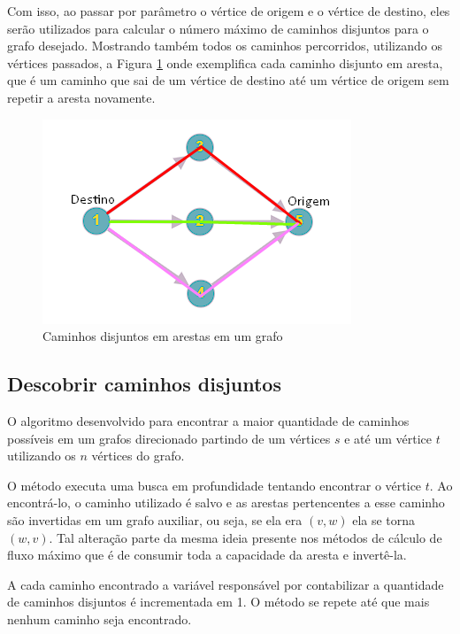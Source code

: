 Com isso, ao passar por parâmetro o vértice de origem e o vértice de destino, eles serão utilizados para calcular o número máximo de caminhos disjuntos para o grafo desejado. Mostrando também todos os caminhos percorridos, utilizando os vértices passados, a Figura \ref{fig:figure2} onde exemplifica cada caminho disjunto em aresta, que é um caminho que sai de um vértice de destino até um vértice de origem sem repetir a aresta novamente.

\newpage

\begin{figure}[ht]
    \centering
    \includegraphics[width=.5\textwidth]{figuras/disjoint paths.png}
    \caption{Caminhos disjuntos em arestas em um grafo}
    \label{fig:figure2}
\end{figure}

\subsection{Descobrir caminhos disjuntos}

O algoritmo desenvolvido para encontrar a maior quantidade de caminhos possíveis em um grafos direcionado partindo de um vértices \(s\) e até um vértice \(t\) utilizando os \(n\) vértices do grafo.

O método executa uma busca em profundidade tentando encontrar o vértice \(t\). Ao encontrá-lo, o caminho utilizado é salvo e as arestas pertencentes a esse caminho são invertidas em um grafo auxiliar, ou seja, se ela era \((v,w)\) ela se torna \((w,v)\). Tal alteração parte da mesma ideia presente nos métodos de cálculo de fluxo máximo que é de consumir toda a capacidade da aresta e invertê-la. 

A cada caminho encontrado a variável responsável por contabilizar a quantidade de caminhos disjuntos é incrementada em 1. O método se repete até que mais nenhum caminho seja encontrado.

